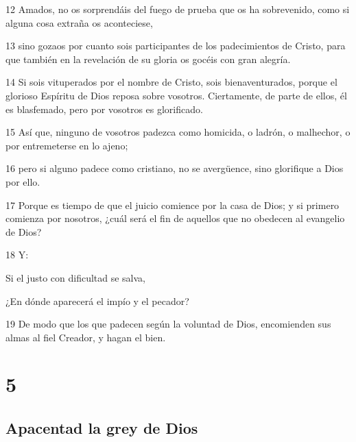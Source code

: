 \par 12 Amados, no os sorprendáis del fuego de prueba que os ha sobrevenido, como si alguna cosa extraña os aconteciese,
\par 13 sino gozaos por cuanto sois participantes de los padecimientos de Cristo, para que también en la revelación de su gloria os gocéis con gran alegría.
\par 14 Si sois vituperados por el nombre de Cristo, sois bienaventurados, porque el glorioso Espíritu de Dios reposa sobre vosotros. Ciertamente, de parte de ellos, él es blasfemado, pero por vosotros es glorificado.
\par 15 Así que, ninguno de vosotros padezca como homicida, o ladrón, o malhechor, o por entremeterse en lo ajeno;
\par 16 pero si alguno padece como cristiano, no se avergüence, sino glorifique a Dios por ello.
\par 17 Porque es tiempo de que el juicio comience por la casa de Dios; y si primero comienza por nosotros, ¿cuál será el fin de aquellos que no obedecen al evangelio de Dios?
\par 18 Y:
\par Si el justo con dificultad se salva,
\par ¿En dónde aparecerá el impío y el pecador?
\par 19 De modo que los que padecen según la voluntad de Dios, encomienden sus almas al fiel Creador, y hagan el bien.

\chapter{5}

\section*{Apacentad la grey de Dios}


